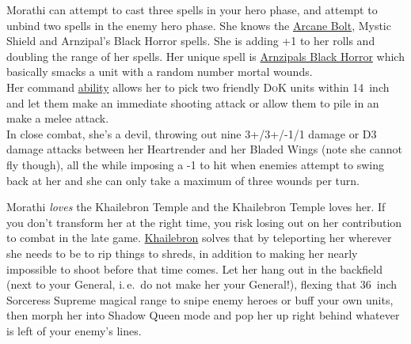Morathi can attempt to cast three spells in your hero phase, and attempt to
 unbind two spells in the enemy hero
phase. She knows the \hyperref[arcane-bolt]{Arcane Bolt}, Mystic Shield and
Arnzipal's Black Horror spells.  She is adding +1 to her rolls and doubling the
range of her spells.  Her unique spell is
\hyperref[spell:arnzipals-black-horror]{Arnzipals Black Horror} which basically
smacks a unit with a random number mortal wounds.\\ Her command
\hyperref[worship-through-bloodshed]{ability} allows her to pick two friendly
\textsc{DoK} units within 14~inch and let them make an immediate shooting
attack or allow them to pile in an make a melee attack.\\  In close combat, she's a devil, throwing out nine
3+/3+/-1/1 damage or D3 damage attacks between her Heartrender and her Bladed
Wings (note she cannot fly though), all the while imposing a -1 to hit when
enemies attempt to swing back at her and she can only take a maximum of three
wounds per turn. 

Morathi \emph{loves} the Khailebron Temple and the Khailebron Temple loves her.
If you don't transform her at the right time, you risk losing out on her
contribution to combat in the late game.
\hyperref[temple:khailebron]{Khailebron} solves that by teleporting her
wherever she needs to be to rip things to shreds, in addition to making her
nearly impossible to shoot before that time comes. Let her hang out in the
backfield (next to your General, i.\,e.\, do not make her your General!),
flexing that 36~inch Sorceress Supreme magical range to snipe enemy heroes or
buff your own units, then morph her into Shadow Queen mode and pop her up right
behind whatever is left of your enemy's lines. 

